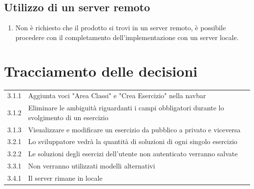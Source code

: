 \documentclass[11pt,a4paper]{article}
\begin{document}
	\subsection{Utilizzo di un server remoto}
	\begin{enumerate}
	\item Non è richiesto che il prodotto si trovi in un server remoto, è possibile procedere con il completamento dell'implementazione con un server locale.
\end{enumerate} 
	\section{Tracciamento delle decisioni}
	
	\begin{tabular}{|l|l|}\hline
		3.1.1 & Aggiunta voci "Area Classi" e "Crea Esercizio" nella navbar\\
		3.1.2 & Eliminare le ambiguità riguardanti i campi obbligatori durante lo svolgimento di un esercizio\\
		3.1.3 & Visualizzare e modificare un esercizio da pubblico a privato e viceversa \\
		3.2.1 & Lo sviluppatore vedrà la quantità di soluzioni di ogni singolo esercizio \\ 
		3.2.2 & Le soluzioni degli esercizi dell'utente non autenticato verranno salvate \\ 
		3.3.1 & Non verranno utilizzati modelli alternativi \\ 
		3.4.1 & Il server rimane in locale\\
		\hline 
	\end{tabular}
	
\end{document}

